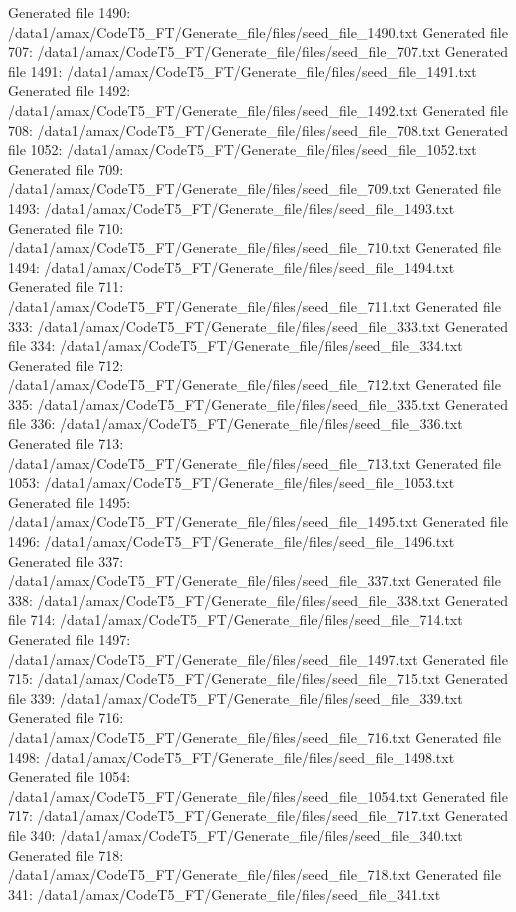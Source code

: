Generated file 1490: /data1/amax/CodeT5_FT/Generate_file/files/seed_file_1490.txt
Generated file 707: /data1/amax/CodeT5_FT/Generate_file/files/seed_file_707.txt
Generated file 1491: /data1/amax/CodeT5_FT/Generate_file/files/seed_file_1491.txt
Generated file 1492: /data1/amax/CodeT5_FT/Generate_file/files/seed_file_1492.txt
Generated file 708: /data1/amax/CodeT5_FT/Generate_file/files/seed_file_708.txt
Generated file 1052: /data1/amax/CodeT5_FT/Generate_file/files/seed_file_1052.txt
Generated file 709: /data1/amax/CodeT5_FT/Generate_file/files/seed_file_709.txt
Generated file 1493: /data1/amax/CodeT5_FT/Generate_file/files/seed_file_1493.txt
Generated file 710: /data1/amax/CodeT5_FT/Generate_file/files/seed_file_710.txt
Generated file 1494: /data1/amax/CodeT5_FT/Generate_file/files/seed_file_1494.txt
Generated file 711: /data1/amax/CodeT5_FT/Generate_file/files/seed_file_711.txt
Generated file 333: /data1/amax/CodeT5_FT/Generate_file/files/seed_file_333.txt
Generated file 334: /data1/amax/CodeT5_FT/Generate_file/files/seed_file_334.txt
Generated file 712: /data1/amax/CodeT5_FT/Generate_file/files/seed_file_712.txt
Generated file 335: /data1/amax/CodeT5_FT/Generate_file/files/seed_file_335.txt
Generated file 336: /data1/amax/CodeT5_FT/Generate_file/files/seed_file_336.txt
Generated file 713: /data1/amax/CodeT5_FT/Generate_file/files/seed_file_713.txt
Generated file 1053: /data1/amax/CodeT5_FT/Generate_file/files/seed_file_1053.txt
Generated file 1495: /data1/amax/CodeT5_FT/Generate_file/files/seed_file_1495.txt
Generated file 1496: /data1/amax/CodeT5_FT/Generate_file/files/seed_file_1496.txt
Generated file 337: /data1/amax/CodeT5_FT/Generate_file/files/seed_file_337.txt
Generated file 338: /data1/amax/CodeT5_FT/Generate_file/files/seed_file_338.txt
Generated file 714: /data1/amax/CodeT5_FT/Generate_file/files/seed_file_714.txt
Generated file 1497: /data1/amax/CodeT5_FT/Generate_file/files/seed_file_1497.txt
Generated file 715: /data1/amax/CodeT5_FT/Generate_file/files/seed_file_715.txt
Generated file 339: /data1/amax/CodeT5_FT/Generate_file/files/seed_file_339.txt
Generated file 716: /data1/amax/CodeT5_FT/Generate_file/files/seed_file_716.txt
Generated file 1498: /data1/amax/CodeT5_FT/Generate_file/files/seed_file_1498.txt
Generated file 1054: /data1/amax/CodeT5_FT/Generate_file/files/seed_file_1054.txt
Generated file 717: /data1/amax/CodeT5_FT/Generate_file/files/seed_file_717.txt
Generated file 340: /data1/amax/CodeT5_FT/Generate_file/files/seed_file_340.txt
Generated file 718: /data1/amax/CodeT5_FT/Generate_file/files/seed_file_718.txt
Generated file 341: /data1/amax/CodeT5_FT/Generate_file/files/seed_file_341.txt
